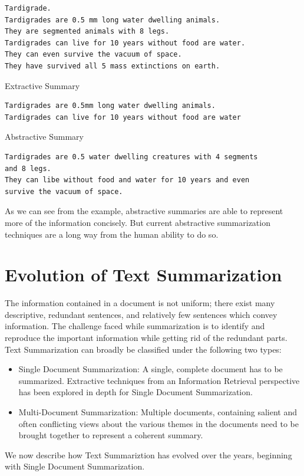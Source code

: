 \documentclass[BTech]{nitgoathesis}
\begin{document}
\begin{lstlisting}[numbers=none]
Tardigrade.
Tardigrades are 0.5 mm long water dwelling animals.
They are segmented animals with 8 legs.
Tardigrades can live for 10 years without food are water.
They can even survive the vacuum of space.
They have survived all 5 mass extinctions on earth.
\end{lstlisting}
\vspace{1.2em}
{\large Extractive Summary}
\begin{lstlisting}[numbers=none]
Tardigrades are 0.5mm long water dwelling animals.
Tardigrades can live for 10 years without food are water
\end{lstlisting}
\vspace{1.2em}
{\large Abstractive Summary}
\begin{lstlisting}[numbers=none]
Tardigrades are 0.5 water dwelling creatures with 4 segments 
and 8 legs.
They can libe without food and water for 10 years and even 
survive the vacuum of space.
\end{lstlisting}
As we can see from the example, abstractive summaries are able to represent more of the information concisely. But current abstractive summarization techniques are a long way from the human ability to do so.


\section{Evolution of Text Summarization}
The information contained in a document is not uniform; there exist many descriptive, redundant sentences, and relatively few sentences which convey information. The challenge faced while summarization is to identify and reproduce the important information while getting rid of the redundant parts. Text Summarization can broadly be classified under the following two types:
\par
\begin{itemize}
\item Single Document Summarization: A single, complete document has to be summarized. Extractive techniques from an Information Retrieval perspective has been explored in depth for Single Document Summarization.
\item Multi-Document Summarization: Multiple documents, containing salient and often conflicting views about the various themes in the documents need to be brought together to represent a coherent summary.
\end{itemize}
We now describe how Text Summariztion has evolved over the years, beginning with Single Document Summarization.
\end{document}
